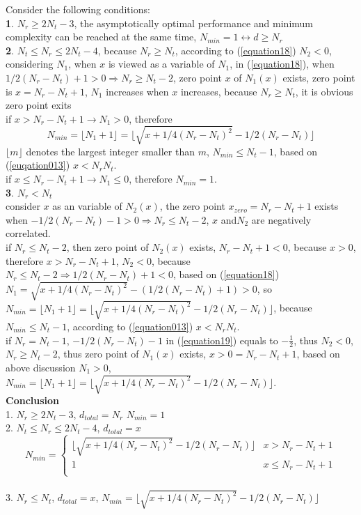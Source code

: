 \documentclass[12pt,a4paper,final]{article}
\begin{document}
\begin{spacing}{2.5}
Consider the following conditions:\\
\textbf{1}. $N_{r}\geq 2N_{t}-3$, the asymptotically optimal performance and minimum complexity can be reached at the same time, $N_{min}=1\leftrightarrow d\geq N_{r}$\cite{2}\\
\textbf{2}. $N_{t}\leq N_r\leq 2N_{t}-4$, because $N_{r}\geq N_{t}$, according to (\ref{equation18}) $N_{2}<0$, considering $N_{1}$, when $x$ is viewed as a variable of $N_{1}$, in (\ref{equation18}), when $1/2(N_{r}-N_{t})+1>0\Rightarrow N_{r}\geq N_{t}-2$, zero point $x$ of $N_{1}(x)$ exists, zero point is $x=N_{r}-N_{t}+1$, $N_{1}$ increases when $x$ increases, because $N_{r}\geq N_{t}$, it is obvious zero point exits\\
if $x>N_{r}-N_{t}+1\rightarrow N_{1}>0$, therefore 
\begin{equation}
N_{min}=\lfloor N_{1}+1 \rfloor = \lfloor \sqrt{x+1/4(N_{r}-N_{t})^2}-1/2(N_{r}-N_{t}) \rfloor\label{equation013}
\end{equation}
$\lfloor m \rfloor$ denotes the largest integer smaller than $m$, $N_{min}\leq N_{t}-1$, based on (\ref{euqation013}) $x<N_{r}N_{t}$.\\
if $x\leq N_{r}-N_{t}+1\rightarrow N_{1}\leq 0$, therefore $N_{min}=1$.\\
\textbf{3}. $N_{r}<N_{t}$\\
consider $x$ as an variable of $N_{2}(x)$, the zero point $x_{zero}=N_{r}-N_{t}+1$ exists when $-1/2(N_{r}-N_{t})-1>0\Rightarrow N_{r}\leq N_{t}-2$, $x$ and$N_{2}$ are negatively correlated.\\
if $N_{r}\leq N_{t}-2$, then zero point of $N_{2}(x)$ exists, $N_{r}-N_{t}+1<0$, because $x>0$, therefore $x>N_{r}-N_{t}+1$,
$N_{2}<0$, because $N_{r}\leq N_{t}-2 \Rightarrow 1/2(N_{r}-N_{t})+1<0$, based on (\ref{equation18}) $N_{1}=\sqrt{x+1/4(N_{r}-N_{t})^2}-(1/2(N_{r}-N_{t})+1)>0$, so $N_{min}=\lfloor N_{1}+1 \rfloor = \lfloor \sqrt{x+1/4(N_{r}-N_{t})^2}-1/2(N_{r}-N_{t}) \rfloor$, because $N_{min}\leq N_{t}-1$, according to (\ref{equation013}) $x<N_{r}N_{t}$.\\
if $N_{r}=N_{t}-1$, $-1/2(N_{r}-N_{t})-1$ in (\ref{equation19}) equals to $-\frac{1}{2}$, thus $N_{2}<0$, $N_{r}\geq N_{t}-2$, thus zero point of $N_{1}(x)$ exists, $x>0=N_{r}-N_{t}+1$, based on above discussion $N_{1}>0$, $N_{min}=\lfloor N_{1}+1 \rfloor = \lfloor \sqrt{x+1/4(N_{r}-N_{t})^2}-1/2(N_{r}-N_{t}) \rfloor$.\\
\textbf{Conclusion}\\
1. $N_{r}\geq 2N_{t}-3$, $d_{total}=N_{r}$ $N_{min}=1$\\
2. $N_{t}\leq N_r\leq 2N_{t}-4$, $d_{total}=x$
\begin{displaymath}
N_{min}=\left\{\begin{array}{ll}
\lfloor \sqrt{x+1/4(N_{r}-N_{t})^2}-1/2(N_{r}-N_{t}) \rfloor & x>N_{r}-N_{t}+1\\
1 & x\leq N_{r}-N_{t}+1\\
\end{array}\right.
\end{displaymath}\\
3. $N_{r}\leq N_{t}$, $d_{total}=x$, $N_{min}=\lfloor \sqrt{x+1/4(N_{r}-N_{t})^2}-1/2(N_{r}-N_{t}) \rfloor$


\end{spacing}
\end{document}
